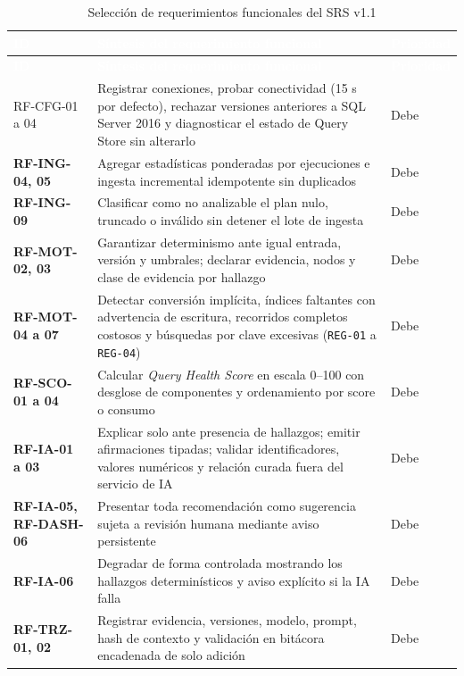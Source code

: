\documentclass[12pt,a4paper]{article}
\begin{document}
\begingroup
{}
\scriptsize
\begin{longtable}{>{\bfseries}p{} p{} p{}}
\toprule
\rowcolor{utbblue}
\textcolor{white}{\textbf{ID}} & \textcolor{white}{\textbf{Síntesis del requerimiento funcional}} & \textcolor{white}{\textbf{Prioridad}} \\
\midrule
\endfirsthead
\toprule
\rowcolor{utbblue}
\textcolor{white}{\textbf{ID}} & \textcolor{white}{\textbf{Síntesis del requerimiento funcional}} & \textcolor{white}{\textbf{Prioridad}} \\
\midrule
\endhead
\bottomrule
\caption{Selección de requerimientos funcionales del SRS v1.1}
\label{tab:rf-resumen}
\endlastfoot
RF-CFG-01 a 04 & Registrar conexiones, probar conectividad (15 s por defecto), rechazar versiones anteriores a SQL Server 2016 y diagnosticar el estado de Query Store sin alterarlo & Debe \\
RF-ING-04, 05 & Agregar estadísticas ponderadas por ejecuciones e ingesta incremental idempotente sin duplicados & Debe \\
RF-ING-09 & Clasificar como no analizable el plan nulo, truncado o inválido sin detener el lote de ingesta & Debe \\
RF-MOT-02, 03 & Garantizar determinismo ante igual entrada, versión y umbrales; declarar evidencia, nodos y clase de evidencia por hallazgo & Debe \\
RF-MOT-04 a 07 & Detectar conversión implícita, índices faltantes con advertencia de escritura, recorridos completos costosos y búsquedas por clave excesivas (\texttt{REG-01} a \texttt{REG-04}) & Debe \\
RF-SCO-01 a 04 & Calcular \textit{Query Health Score} en escala 0--100 con desglose de componentes y ordenamiento por score o consumo & Debe \\
RF-IA-01 a 03 & Explicar solo ante presencia de hallazgos; emitir afirmaciones tipadas; validar identificadores, valores numéricos y relación curada fuera del servicio de IA & Debe \\
RF-IA-05, RF-DASH-06 & Presentar toda recomendación como sugerencia sujeta a revisión humana mediante aviso persistente & Debe \\
RF-IA-06 & Degradar de forma controlada mostrando los hallazgos determinísticos y aviso explícito si la IA falla & Debe \\
RF-TRZ-01, 02 & Registrar evidencia, versiones, modelo, prompt, hash de contexto y validación en bitácora encadenada de solo adición & Debe \\

\end{longtable}
\end{document}
